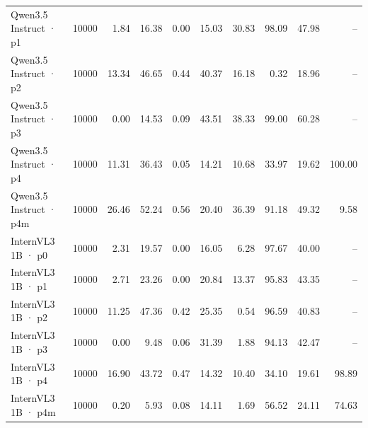 \begin{tabular}{lrrrrrrrrr}
Qwen3.5 Instruct · p1 & 10000 & 1.84 & 16.38 & 0.00 & 15.03 & 30.83 & 98.09 & 47.98 & -- \\
Qwen3.5 Instruct · p2 & 10000 & 13.34 & 46.65 & 0.44 & 40.37 & 16.18 & 0.32 & 18.96 & -- \\
Qwen3.5 Instruct · p3 & 10000 & 0.00 & 14.53 & 0.09 & 43.51 & 38.33 & 99.00 & 60.28 & -- \\
Qwen3.5 Instruct · p4 & 10000 & 11.31 & 36.43 & 0.05 & 14.21 & 10.68 & 33.97 & 19.62 & 100.00 \\
Qwen3.5 Instruct · p4m & 10000 & 26.46 & 52.24 & 0.56 & 20.40 & 36.39 & 91.18 & 49.32 & 9.58 \\
InternVL3 1B · p0 & 10000 & 2.31 & 19.57 & 0.00 & 16.05 & 6.28 & 97.67 & 40.00 & -- \\
InternVL3 1B · p1 & 10000 & 2.71 & 23.26 & 0.00 & 20.84 & 13.37 & 95.83 & 43.35 & -- \\
InternVL3 1B · p2 & 10000 & 11.25 & 47.36 & 0.42 & 25.35 & 0.54 & 96.59 & 40.83 & -- \\
InternVL3 1B · p3 & 10000 & 0.00 & 9.48 & 0.06 & 31.39 & 1.88 & 94.13 & 42.47 & -- \\
InternVL3 1B · p4 & 10000 & 16.90 & 43.72 & 0.47 & 14.32 & 10.40 & 34.10 & 19.61 & 98.89 \\
InternVL3 1B · p4m & 10000 & 0.20 & 5.93 & 0.08 & 14.11 & 1.69 & 56.52 & 24.11 & 74.63 \\
\bottomrule
\end{tabular}
